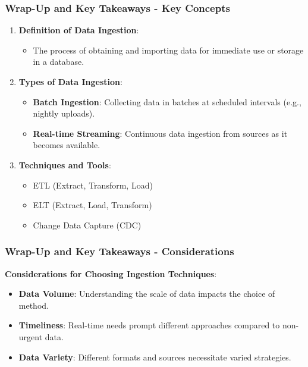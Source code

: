 \documentclass{beamer}
\begin{document}
\begin{frame}[fragile]
    \frametitle{Wrap-Up and Key Takeaways - Key Concepts}
    \begin{enumerate}
        \item \textbf{Definition of Data Ingestion}:
        \begin{itemize}
            \item The process of obtaining and importing data for immediate use or storage in a database.
        \end{itemize}
        
        \item \textbf{Types of Data Ingestion}:
        \begin{itemize}
            \item \textbf{Batch Ingestion}: Collecting data in batches at scheduled intervals (e.g., nightly uploads).
            \item \textbf{Real-time Streaming}: Continuous data ingestion from sources as it becomes available.
        \end{itemize}
        
        \item \textbf{Techniques and Tools}:
        \begin{itemize}
            \item ETL (Extract, Transform, Load)
            \item ELT (Extract, Load, Transform)
            \item Change Data Capture (CDC)
        \end{itemize}
    \end{enumerate}
\end{frame}

\begin{frame}[fragile]
    \frametitle{Wrap-Up and Key Takeaways - Considerations}
    \textbf{Considerations for Choosing Ingestion Techniques}:
    \begin{itemize}
        \item \textbf{Data Volume}: Understanding the scale of data impacts the choice of method.
        \item \textbf{Timeliness}: Real-time needs prompt different approaches compared to non-urgent data.
        \item \textbf{Data Variety}: Different formats and sources necessitate varied strategies.
    \end{itemize}
\end{frame}
\end{document}
